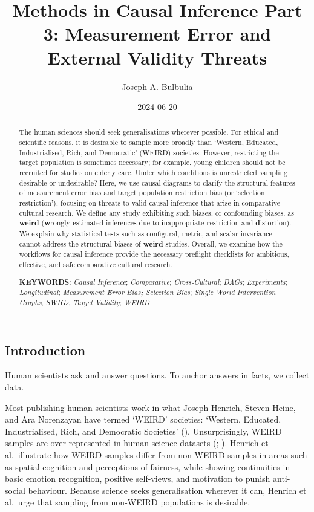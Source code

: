 \documentclass[
  single column]{article}
\title{Methods in Causal Inference Part 3: Measurement Error and
External Validity Threats}
\author{Joseph A. Bulbulia}
\affil{%
             \small{     Victoria University of Wellington, NEW ZEALAND
          ORCID \textcolor[HTML]{A6CE39}{\aiOrcid} ~0000-0002-5861-2056 }
              }
\date{2024-06-20}
\begin{document}
\maketitle
\begin{abstract}
The human sciences should seek generalisations wherever possible. For
ethical and scientific reasons, it is desirable to sample more broadly
than `Western, Educated, Industrialised, Rich, and Democratic' (WEIRD)
societies. However, restricting the target population is sometimes
necessary; for example, young children should not be recruited for
studies on elderly care. Under which conditions is unrestricted sampling
desirable or undesirable? Here, we use causal diagrams to clarify the
structural features of measurement error bias and target population
restriction bias (or `selection restriction'), focusing on threats to
valid causal inference that arise in comparative cultural research. We
define any study exhibiting such biases, or confounding biases, as
\textbf{weird} (\textbf{w}rongly \textbf{e}stimated inferences due to
\textbf{i}nappropriate \textbf{r}estriction and \textbf{d}istortion). We
explain why statistical tests such as configural, metric, and scalar
invariance cannot address the structural biases of \textbf{weird}
studies. Overall, we examine how the workflows for causal inference
provide the necessary preflight checklists for ambitious, effective, and
safe comparative cultural research.

\textbf{KEYWORDS}: \emph{Causal Inference}; \emph{Comparative};
\emph{Cross-Cultural}; \emph{DAGs}; \emph{Experiments};
\emph{Longitudinal}; \emph{Measurement Error Bias\textbf{; }Selection
Bias}; \emph{Single World Intervention Graphs}, \emph{SWIGs},
\emph{Target Validity}; \emph{WEIRD}
\end{abstract}

\subsection{Introduction}\label{id-sec-intro}

Human scientists ask and answer questions. To anchor answers in facts,
we collect data.

Most publishing human scientists work in what Joseph Henrich, Steven
Heine, and Ara Norenzayan have termed `WEIRD' societies: `Western,
Educated, Industrialised, Rich, and Democratic Societies'
().
Unsurprisingly, WEIRD samples are over-represented in human science
datasets (;
). Henrich et al.~illustrate
how WEIRD samples differ from non-WEIRD samples in areas such as spatial
cognition and perceptions of fairness, while showing continuities in
basic emotion recognition, positive self-views, and motivation to punish
anti-social behaviour. Because science seeks generalisation wherever it
can, Henrich et al.~urge that sampling from non-WEIRD populations is
desirable.
\end{document}
